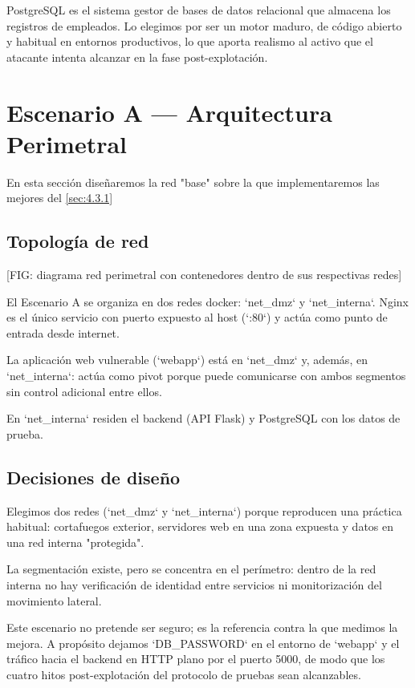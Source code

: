         PostgreSQL es el sistema gestor de bases de datos relacional que almacena los registros de empleados. Lo elegimos por ser un motor maduro, de código abierto y habitual en entornos productivos, lo que aporta realismo al activo que el atacante intenta alcanzar en la fase post-explotación.

        
    \section{Escenario A — Arquitectura Perimetral}
    En esta sección diseñaremos la red "base" sobre la que implementaremos las mejores del \cref{sec:4.3.1}
        
        \subsection{Topología de red}
        [FIG: diagrama red perimetral con contenedores dentro de sus respectivas redes]
        
        El Escenario A se organiza en dos redes docker: `net\_dmz` y `net\_interna`. Nginx es el único servicio con puerto expuesto al host (`:80`) y actúa como punto de entrada desde internet.
        
        La aplicación web vulnerable (`webapp`) está en `net\_dmz` y, además, en `net\_interna`: actúa como pivot porque puede comunicarse con ambos segmentos sin control adicional entre ellos. 
        
        En `net\_interna` residen el backend (API Flask) y PostgreSQL con los datos de prueba.
        
        \subsection{Decisiones de diseño}
        Elegimos dos redes (`net\_dmz` y `net\_interna`) porque reproducen una práctica habitual: cortafuegos exterior, servidores web en una zona expuesta y datos en una red interna "protegida".
        
        La segmentación existe, pero se concentra en el perímetro: dentro de la red interna no hay verificación de identidad entre servicios ni monitorización del movimiento lateral.
        
        Este escenario no pretende ser seguro; es la referencia contra la que medimos la mejora. A propósito dejamos `DB\_PASSWORD` en el entorno de `webapp` y el tráfico hacia el backend en HTTP plano por el puerto 5000, de modo que los cuatro hitos post-explotación del protocolo de pruebas sean alcanzables. 
        
